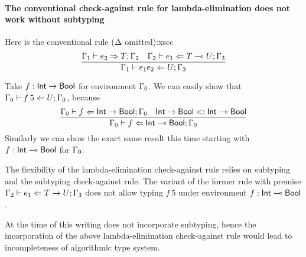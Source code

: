 
\paragraph{The conventional check-against rule for lambda-elimination
  does not work without subtyping}

Here is the  conventional rule ($\kindEnv$ omitted):xscc
%
\begin{equation*}
    \frac{
      \algtypeout[\varEnv_1]{e_2}{T}{\varEnv_2}
      \quad
      \algtypein[\varEnv_2]{e_1}{T\multimap U}{\varEnv_3}
    }{
      \algtypein[\varEnv_1]{e_1e_2}{U}{\varEnv_3}
    }  
\end{equation*}

Take $f: \intt\rightarrow\boolt$ for environment $\varEnv_0$. We can
easily show that $\algtypein[\varEnv_0]{f\:5}{U}{\varEnv_0}$, because
%
\begin{equation*}
  \frac{
    \algtypein[\varEnv_0]{f}{\intt\rightarrow\boolt}{\varEnv_0}
    \quad
    \intt\rightarrow\boolt \subt \intt\multimap\boolt
  }{
    \algtypein[\varEnv_0]{f}{\intt\multimap\boolt}{\varEnv_0}
  }
\end{equation*}
%
Similarly we can show the exact same result this time starting with
$f: \intt\multimap\boolt$ for $\varEnv_0$.

The flexibility of the lambda-elimination check-against rule relies on
subtyping and the subtyping check-against rule. The variant of the
former rule with premise $\algtypein[\varEnv_2]{e_1}{T\rightarrow
  U}{\varEnv_3}$ does not allow typing $f\:5$ under environment $f:
\intt\multimap\boolt$.

At the time of this writing \freest does not incorporate subtyping,
hence the incorporation of the above  lambda-elimination check-against
rule would lead to incompleteness of algorithmic type system.

